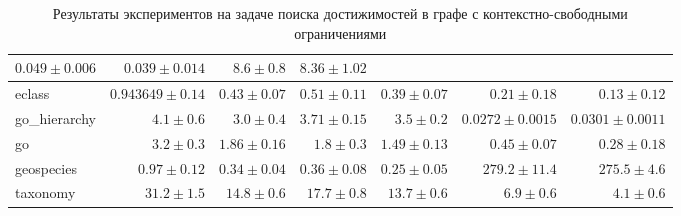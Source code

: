 \begin{landscape}
\begin{table}[]
{\begin{tabular}{|l|rrrrrr|}
  \multicolumn{1}{r|}{$0.049 \pm 0.006$} &
  \multicolumn{1}{r|}{$0.039 \pm 0.014$} &
  \multicolumn{1}{r|}{$8.6 \pm 0.8$} &
  $8.36 \pm 1.02$ \\ \hline
eclass &
  \multicolumn{1}{r|}{$0.943649 \pm 0.14$} &
  \multicolumn{1}{r|}{$0.43 \pm 0.07$} &
  \multicolumn{1}{r|}{$0.51 \pm 0.11$} &
  \multicolumn{1}{r|}{$0.39 \pm 0.07$} &
  \multicolumn{1}{r|}{$0.21 \pm 0.18$} &
  $0.13 \pm 0.12$ \\ \hline
go\_hierarchy &
  \multicolumn{1}{r|}{$4.1 \pm 0.6$} &
  \multicolumn{1}{r|}{$3.0 \pm 0.4$} &
  \multicolumn{1}{r|}{$3.71 \pm 0.15$} &
  \multicolumn{1}{r|}{$3.5 \pm 0.2$} &
  \multicolumn{1}{r|}{$0.0272 \pm 0.0015$} &
  $0.0301 \pm 0.0011$ \\ \hline
go &
  \multicolumn{1}{r|}{$3.2 \pm 0.3$} &
  \multicolumn{1}{r|}{$1.86 \pm 0.16$} &
  \multicolumn{1}{r|}{$1.8 \pm 0.3$} &
  \multicolumn{1}{r|}{$1.49 \pm 0.13$} &
  \multicolumn{1}{r|}{$0.45 \pm 0.07$} &
  $0.28 \pm 0.18$ \\ \hline
geospecies &
  \multicolumn{1}{r|}{$0.97 \pm 0.12$} &
  \multicolumn{1}{r|}{$0.34 \pm 0.04$} &
  \multicolumn{1}{r|}{$0.36 \pm 0.08$} &
  \multicolumn{1}{r|}{$0.25 \pm 0.05$} &
  \multicolumn{1}{r|}{$279.2 \pm 11.4$} &
  $275.5 \pm 4.6$ \\ \hline
taxonomy &
  \multicolumn{1}{r|}{$31.2 \pm 1.5$} &
  \multicolumn{1}{r|}{$14.8 \pm 0.6$} &
  \multicolumn{1}{r|}{$17.7 \pm 0.8$} &
  \multicolumn{1}{r|}{$13.7 \pm 0.6$} &
  \multicolumn{1}{r|}{$6.9 \pm 0.6$} &
  $4.1 \pm 0.6$ \\ \hline
\end{tabular}%
}
\caption{Результаты экспериментов на задаче поиска достижимостей в графе с контекстно-свободными ограничениями}
\label{tab:results_without_sppf}
\end{table}
\end{landscape}